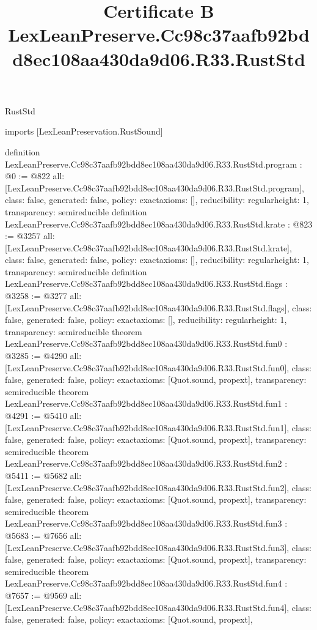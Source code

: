 \begin{lexlean}{RustStd}
\title{Certificate B LexLeanPreserve.Cc98c37aafb92bdd8ec108aa430da9d06.R33.RustStd}
\begin{coremodule}
imports [LexLeanPreservation.RustSound]

definition LexLeanPreserve.Cc98c37aafb92bdd8ec108aa430da9d06.R33.RustStd.program : @0 := @822 {
  all: [LexLeanPreserve.Cc98c37aafb92bdd8ec108aa430da9d06.R33.RustStd.program],
  class: false,
  generated: false,
  policy: exact{axioms: []},
  reducibility: regular{height: 1},
  transparency: semireducible
}
definition LexLeanPreserve.Cc98c37aafb92bdd8ec108aa430da9d06.R33.RustStd.krate : @823 := @3257 {
  all: [LexLeanPreserve.Cc98c37aafb92bdd8ec108aa430da9d06.R33.RustStd.krate],
  class: false,
  generated: false,
  policy: exact{axioms: []},
  reducibility: regular{height: 1},
  transparency: semireducible
}
definition LexLeanPreserve.Cc98c37aafb92bdd8ec108aa430da9d06.R33.RustStd.flags : @3258 := @3277 {
  all: [LexLeanPreserve.Cc98c37aafb92bdd8ec108aa430da9d06.R33.RustStd.flags],
  class: false,
  generated: false,
  policy: exact{axioms: []},
  reducibility: regular{height: 1},
  transparency: semireducible
}
theorem LexLeanPreserve.Cc98c37aafb92bdd8ec108aa430da9d06.R33.RustStd.fun0 : @3285 := @4290 {
  all: [LexLeanPreserve.Cc98c37aafb92bdd8ec108aa430da9d06.R33.RustStd.fun0],
  class: false,
  generated: false,
  policy: exact{axioms: [Quot.sound, propext]},
  transparency: semireducible
}
theorem LexLeanPreserve.Cc98c37aafb92bdd8ec108aa430da9d06.R33.RustStd.fun1 : @4291 := @5410 {
  all: [LexLeanPreserve.Cc98c37aafb92bdd8ec108aa430da9d06.R33.RustStd.fun1],
  class: false,
  generated: false,
  policy: exact{axioms: [Quot.sound, propext]},
  transparency: semireducible
}
theorem LexLeanPreserve.Cc98c37aafb92bdd8ec108aa430da9d06.R33.RustStd.fun2 : @5411 := @5682 {
  all: [LexLeanPreserve.Cc98c37aafb92bdd8ec108aa430da9d06.R33.RustStd.fun2],
  class: false,
  generated: false,
  policy: exact{axioms: [Quot.sound, propext]},
  transparency: semireducible
}
theorem LexLeanPreserve.Cc98c37aafb92bdd8ec108aa430da9d06.R33.RustStd.fun3 : @5683 := @7656 {
  all: [LexLeanPreserve.Cc98c37aafb92bdd8ec108aa430da9d06.R33.RustStd.fun3],
  class: false,
  generated: false,
  policy: exact{axioms: [Quot.sound, propext]},
  transparency: semireducible
}
theorem LexLeanPreserve.Cc98c37aafb92bdd8ec108aa430da9d06.R33.RustStd.fun4 : @7657 := @9569 {
  all: [LexLeanPreserve.Cc98c37aafb92bdd8ec108aa430da9d06.R33.RustStd.fun4],
  class: false,
  generated: false,
  policy: exact{axioms: [Quot.sound, propext]},
}
\end{coremodule}
\end{lexlean}
